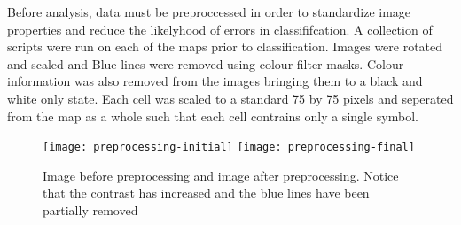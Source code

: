 Before analysis, data must be preproccessed in order to standardize image
properties and reduce the likelyhood of errors in classififcation. A collection
of scripts were run on each of the maps prior to classification. Images were
rotated and scaled and Blue lines were removed using colour filter masks.
Colour information was also removed from the images bringing them to a black
and white only state. Each cell was scaled to a standard 75 by 75 pixels and
seperated from the map as a whole such that each cell contrains only a single
symbol.

\begin{figure}[h]
    \begin{center}
    \texttt{[image: preprocessing-initial]}
    \texttt{[image: preprocessing-final]}
    \caption{Image before preprocessing and image after preprocessing. Notice
        that the contrast has increased and the blue lines have been partially
        removed}
    \end{center}
\end{figure}
